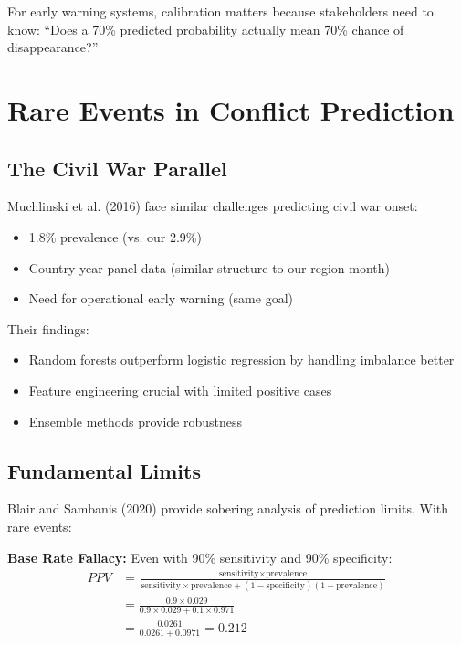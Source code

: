 \documentclass{article}
\begin{document}
For early warning systems, calibration matters because stakeholders need to know: ``Does a 70\% predicted probability actually mean 70\% chance of disappearance?''

\section{Rare Events in Conflict Prediction}

\subsection{The Civil War Parallel}

Muchlinski et al. (2016) face similar challenges predicting civil war onset:
\begin{itemize}
    \item 1.8\% prevalence (vs. our 2.9\%)
    \item Country-year panel data (similar structure to our region-month)
    \item Need for operational early warning (same goal)
\end{itemize}

Their findings:
\begin{itemize}
    \item Random forests outperform logistic regression by handling imbalance better
    \item Feature engineering crucial with limited positive cases
    \item Ensemble methods provide robustness
\end{itemize}

\subsection{Fundamental Limits}

Blair and Sambanis (2020) provide sobering analysis of prediction limits. With rare events:

\textbf{Base Rate Fallacy:} Even with 90\% sensitivity and 90\% specificity:
\begin{align}
PPV &= \frac{\text{sensitivity} \times \text{prevalence}}{\text{sensitivity} \times \text{prevalence} + (1-\text{specificity})(1-\text{prevalence})} \\
    &= \frac{0.9 \times 0.029}{0.9 \times 0.029 + 0.1 \times 0.971} \\
    &= \frac{0.0261}{0.0261 + 0.0971} = 0.212
\end{align}
\end{document}
